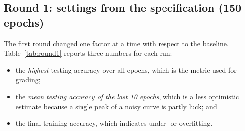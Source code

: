 \documentclass[11pt,a4paper]{article}
\begin{document}
\begin{table}[H]
\centering
\caption{EEGNet as implemented (input $[B,1,2,750]$, 17{,}874 parameters).}
\label{tab:arch}
\small
{}
\end{table}

\subsection{Round 1: settings from the specification (150 epochs)}

The first round changed one factor at a time with respect to the baseline. Table~\ref{tab:round1} reports three numbers for each run:
\begin{itemize}
  \item the \emph{highest} testing accuracy over all epochs, which is the metric used for grading;
  \item the \emph{mean testing accuracy of the last 10 epochs}, which is a less optimistic estimate because a single peak of a noisy curve is partly luck; and
  \item the final training accuracy, which indicates under- or overfitting.
\end{itemize}
\end{document}
